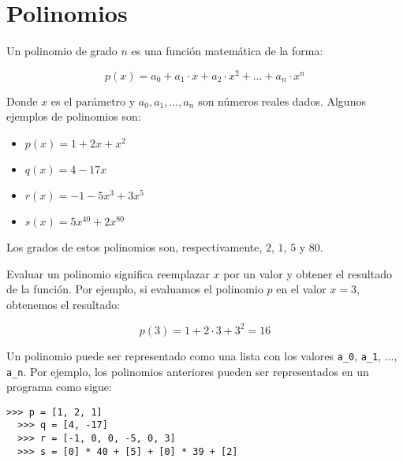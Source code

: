 \section{Polinomios}

  Un polinomio de grado \(n\)
  es una función matemática de la forma:
  
  \begin{equation*}
    p(x) = a_0 + a_1 \cdot x + a_2 \cdot x^2 + \hdots + a_n \cdot x^n
  \end{equation*}
  
  Donde \(x\) es el parámetro y
  \(a_0, a_1, \hdots, a_n\) son números reales dados.
  Algunos ejemplos de polinomios son:
  \begin{itemize}
  \item \(p(x) = 1 + 2x + x^2\)
  \item \(q(x) = 4 - 17x\)
  \item \(r(x) = -1 -5x^3 + 3x^5\)
  \item \(s(x) = 5x^{40} + 2x^{80}\)
  \end{itemize}
  
  Los grados de estos polinomios son, respectivamente,
  \(2\), \(1\), \(5\) y \(80\).
  
  Evaluar un polinomio significa reemplazar \(x\)
  por un valor y obtener el resultado de la función.
  Por ejemplo, si evaluamos el polinomio \(p\)
  en el valor \(x = 3\),
  obtenemos el resultado:
  
  \begin{equation*}
    p(3) = 1 + 2 \cdot 3 + 3^2 = 16
  \end{equation*}
  
  Un polinomio puede ser representado como una lista
  con los valores \texttt{a\_0}, \texttt{a\_1}, ..., \texttt{a\_n}.
  Por ejemplo, los polinomios anteriores
  pueden ser representados en un programa como sigue:
  
  \begin{lstlisting}[style=consola]
  >>> p = [1, 2, 1]
  >>> q = [4, -17]
  >>> r = [-1, 0, 0, -5, 0, 3]
  >>> s = [0] * 40 + [5] + [0] * 39 + [2]
  \end{lstlisting}
  
